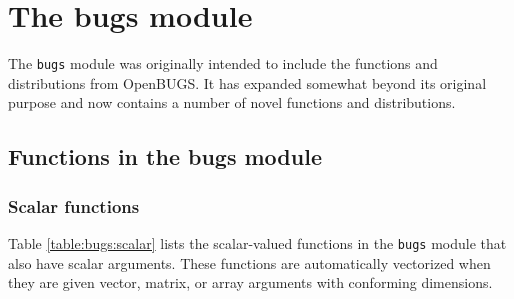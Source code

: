 \documentclass[11pt, a4paper, titlepage]{report}
\newcommand{\OpenBUGS}{\textsf{OpenBUGS}}
\begin{document}
\chapter{The bugs module}
\label{chapter:bugsmod}

The \texttt{bugs} module was originally intended to include the
functions and distributions from \OpenBUGS. It has expanded somewhat
beyond its original purpose and now contains a number of novel
functions and distributions.

\section{Functions in the bugs module}
\label{section:bugs:functions}

\subsection{Scalar functions}

Table \ref{table:bugs:scalar} lists the scalar-valued functions in the
\texttt{bugs} module that also have scalar arguments.  These functions
are automatically vectorized when they are given vector, matrix, or
array arguments with conforming dimensions.
\end{document}
